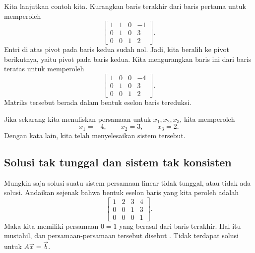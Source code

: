 Kita lanjutkan contoh kita.
Kurangkan baris terakhir dari baris pertama untuk memperoleh
\begin{equation*}
\left[
\begin{array}{ccc|c}
1 & 1 & 0 & -1 \\
0 & 1 & 0 & 3 \\
0 & 0 & 1 & 2
\end{array}
\right] .
\end{equation*}
Entri di atas pivot pada baris kedua sudah nol.
Jadi, kita beralih ke pivot berikutnya, yaitu pivot pada baris kedua. Kita mengurangkan
baris ini dari baris teratas untuk memperoleh
\begin{equation*}
\left[
\begin{array}{ccc|c}
1 & 0 & 0 & -4 \\
0 & 1 & 0 & 3 \\
0 & 0 & 1 & 2
\end{array}
\right] .
\end{equation*}
Matriks tersebut berada dalam bentuk eselon baris tereduksi.

Jika sekarang kita menuliskan persamaan untuk $x_1,x_2,x_3$, kita memperoleh
\begin{equation*}
x_1 = -4, \qquad x_2 = 3, \qquad x_3 = 2 .
\end{equation*}
Dengan kata lain, kita telah menyelesaikan sistem tersebut.

\subsection{Solusi tak tunggal dan sistem tak konsisten}

Mungkin saja
solusi suatu sistem persamaan linear
tidak tunggal, atau tidak ada solusi. Andaikan sejenak
bahwa bentuk eselon baris yang kita peroleh adalah
\begin{equation*}
\left[
\begin{array}{ccc|c}
1 & 2 & 3 & 4 \\
0 & 0 & 1 & 3 \\
0 & 0 & 0 & 1
\end{array}
\right] .
\end{equation*}
Maka kita memiliki persamaan $0=1$ yang berasal dari baris terakhir. Hal itu
mustahil,
dan persamaan-persamaan tersebut disebut \emph{}. Tidak terdapat solusi
untuk $A \vec{x} = \vec{b}$.


